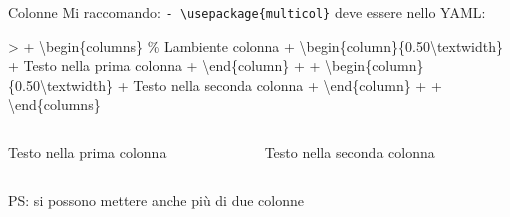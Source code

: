 \documentclass[
  ignorenonframetext,
]{beamer}
\newenvironment{Shaded}{}{}
\newcommand{\CommentTok}[1]{\textcolor[rgb]{0.00,0.50,0.00}{#1}}
\newcommand{\ExtensionTok}[1]{#1}
\newcommand{\FunctionTok}[1]{#1}
\newcommand{\KeywordTok}[1]{\textcolor[rgb]{0.00,0.00,1.00}{#1}}
\newcommand{\NormalTok}[1]{#1}
\begin{document}
\begin{frame}[fragile]{Colonne}
\protect\hypertarget{colonne}{}
Mi raccomando: \texttt{-\ \textbackslash{}usepackage\{multicol\}} deve
essere nello YAML:

\small

\begin{Shaded}
\begin{Highlighting}[]
\NormalTok{\textgreater{} }
\NormalTok{+ }\KeywordTok{\textbackslash{}begin}\NormalTok{\{}\ExtensionTok{columns}\NormalTok{\} }\CommentTok{\% L\textquotesingle{}ambiente colonna}
\NormalTok{+ }\KeywordTok{\textbackslash{}begin}\NormalTok{\{}\ExtensionTok{column}\NormalTok{\}\{0.50}\FunctionTok{\textbackslash{}textwidth}\NormalTok{\}}
\NormalTok{+ Testo nella prima colonna}
\NormalTok{+ }\KeywordTok{\textbackslash{}end}\NormalTok{\{}\ExtensionTok{column}\NormalTok{\}}
\NormalTok{+ }
\NormalTok{+ }\KeywordTok{\textbackslash{}begin}\NormalTok{\{}\ExtensionTok{column}\NormalTok{\}\{0.50}\FunctionTok{\textbackslash{}textwidth}\NormalTok{\}}
\NormalTok{+ Testo nella seconda colonna}
\NormalTok{+ }\KeywordTok{\textbackslash{}end}\NormalTok{\{}\ExtensionTok{column}\NormalTok{\}}
\NormalTok{+ }
\NormalTok{+ }\KeywordTok{\textbackslash{}end}\NormalTok{\{}\ExtensionTok{columns}\NormalTok{\}}
\end{Highlighting}
\end{Shaded}

\pause

\normalsize

\begin{columns} %
\begin{column}{0.50\textwidth}
Testo nella prima colonna
\end{column}

\begin{column}{0.50\textwidth}
Testo nella seconda colonna
\end{column}

\end{columns}

PS: si possono mettere anche più di due colonne
\end{frame}
\end{document}

